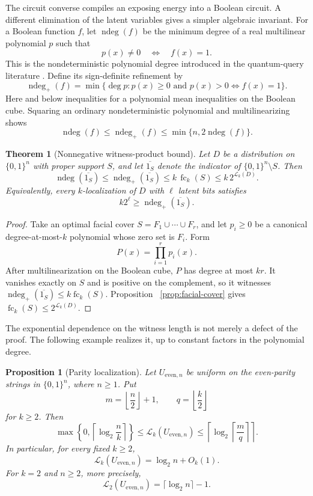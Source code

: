 \documentclass{article}
\newcommand{\LC}{\mathcal{L}}
\newcommand{\ndeg}{\operatorname{ndeg}}
\newcommand{\fc}{\operatorname{fc}}
\newcommand{\bits}{\{0,1\}}
\newtheorem{theorem}{Theorem}
\newtheorem{proposition}{Proposition}
\begin{document}
The circuit converse compiles an exposing energy into a Boolean circuit.  A
different elimination of the latent variables gives a simpler algebraic
invariant.  For a Boolean function $f$, let $\ndeg(f)$ be the minimum degree of
a real multilinear polynomial $p$ such that
\[
  p(x)\ne0\quad\Longleftrightarrow\quad f(x)=1.
\]
This is the nondeterministic polynomial degree introduced in the quantum-query
literature \cite{dewolf03}.  Define its sign-definite refinement by
\[
  \ndeg_+(f)=\min\{\deg p:p(x)\ge0\text{ and }
  p(x)>0\Longleftrightarrow f(x)=1\}.
\]
Here and below inequalities for a polynomial mean inequalities on the Boolean
cube.  Squaring an ordinary nondeterministic polynomial and multilinearizing
shows
\[
  \ndeg(f)\le\ndeg_+(f)\le\min\{n,2\ndeg(f)\}.
\]

\begin{theorem}[Nonnegative witness-product bound]
\label{thm:witness-product}
Let $D$ be a distribution on $\bits^n$ with proper support $S$, and let
$\overline{1_S}$ denote the indicator of $\bits^n\setminus S$.  Then
\[
  \ndeg(\overline{1_S})
  \le \ndeg_+(\overline{1_S})
  \le k\,\fc_k(S)
  \le k\,2^{\LC_k(D)}.
\]
Equivalently, every $k$-localization of $D$ with $\ell$ latent bits satisfies
\[
  k2^\ell\ge \ndeg_+(\overline{1_S}).
\]
\end{theorem}

\begin{proof}
Take an optimal facial cover $S=F_1\cup\cdots\cup F_r$, and let $p_i\ge0$ be
a canonical degree-at-most-$k$ polynomial whose zero set is $F_i$.  Form
\[
  P(x)=\prod_{i=1}^r p_i(x).
\]
After multilinearization on the Boolean cube, $P$ has degree at most
$kr$.  It vanishes exactly on $S$ and is positive on the complement, so it
witnesses $\ndeg_+(\overline{1_S})\le k\fc_k(S)$.  Proposition
~\ref{prop:facial-cover} gives $\fc_k(S)\le2^{\LC_k(D)}$.
\end{proof}

The exponential dependence on the witness length is not merely a defect of
the proof.  The following example realizes it, up to constant factors in the
polynomial degree.

\begin{proposition}[Parity localization]\label{prop:parity}
Let $U_{\mathrm{even},n}$ be uniform on the even-parity strings in $\bits^n$,
where $n\ge1$.  Put
\[
  m=\left\lfloor\frac n2\right\rfloor+1,
  \qquad q=\left\lfloor\frac k2\right\rfloor
\]
for $k\ge2$.  Then
\[
  \max\!\left\{0,\left\lceil\log_2\frac nk\right\rceil\right\}
  \le \LC_k(U_{\mathrm{even},n})
  \le
  \left\lceil
    \log_2\left\lceil\frac mq\right\rceil
  \right\rceil.
\]
In particular, for every fixed $k\ge2$,
\[
  \LC_k(U_{\mathrm{even},n})=\log_2 n+O_k(1).
\]
For $k=2$ and $n\ge2$, more precisely,
\[
  \LC_2(U_{\mathrm{even},n})=\lceil\log_2 n\rceil-1.
\]
\end{proposition}
\end{document}
